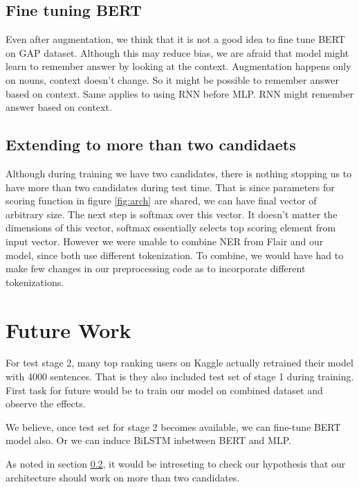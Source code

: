 \documentclass[11pt,a4paper]{article}
\begin{document}
\subsection{Fine tuning BERT}
Even after augmentation, we think that it is not a good idea to fine tune BERT on GAP dataset. Although this may reduce bias, we are afraid that model might learn to remember answer by looking at the context. Augmentation happens only on nouns, context doesn't change. So it might be possible to remember answer based on context. Same applies to using RNN before MLP. RNN might remember answer based on context.

\subsection{Extending to more than two candidaets}
\label{subsec:morecandidates}
Although during training we have two candidates, there is nothing stopping us to have more than two candidates during test time. That is since parameters for scoring function in figure \ref{fig:arch} are shared, we can have final vector of arbitrary size. The next step is softmax over this vector. It doesn't matter the dimensions of this vector, softmax essentially selects top scoring element from input vector. However we were unable to combine NER from Flair and our model, since both use different tokenization. To combine, we would have had to make few changes in our preprocessing code as to incorporate different tokenizations.

\section{Future Work}
For test stage 2, many top ranking users on Kaggle actually retrained their model with 4000 sentences. That is they also included test set of stage 1 during training. First task for future would be to train our model on combined dataset and observe the effects.

We believe, once test set for stage 2 becomes available, we can fine-tune BERT model also. Or we can induce BiLSTM inbetween BERT and MLP.

As noted in section \ref{subsec:morecandidates}, it would be intreseting to check our hypothesis that our architecture should work on more than two candidates.




\appendix
\end{document}
